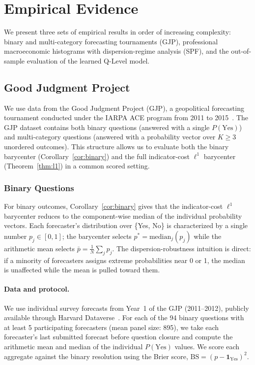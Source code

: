 \section{Empirical Evidence}
\label{sec:empirical}

We present three sets of empirical results in order of increasing complexity: binary and
multi-category forecasting tournaments (GJP), professional macroeconomic histograms with
dispersion-regime analysis (SPF), and the out-of-sample evaluation of the learned Q-Level
model.

\subsection{Good Judgment Project}
\label{sec:gjp}

We use data from the Good Judgment Project (GJP), a geopolitical forecasting tournament conducted under the IARPA ACE program from 2011 to 2015~\cite{tetlock16}.  The GJP dataset contains both binary questions (answered with a single $P(\text{Yes})$) and multi-category questions (answered with a probability vector over $K \geq 3$ unordered outcomes).  This structure allows us to evaluate both the binary barycenter (Corollary~\ref{cor:binary}) and the full indicator-cost $\ell^1$ barycenter (Theorem~\ref{thm:l1}) in a common scored setting.

\subsubsection{Binary Questions}
\label{sec:gjp_binary}

For binary outcomes, Corollary~\ref{cor:binary} gives that the indicator-cost $\ell^1$ barycenter reduces to the component-wise median of the individual probability vectors.  Each forecaster's distribution over \{Yes, No\} is characterized by a single number $p_j \in [0,1]$; the barycenter selects $p^* = \mathrm{median}_j(p_j)$ while the arithmetic mean selects $\bar{p} = \frac{1}{N}\sum_j p_j$.  The dispersion-robustness intuition is direct: if a minority of forecasters assigns extreme probabilities near 0 or 1, the median is unaffected while the mean is pulled toward them.

\paragraph{Data and protocol.}  We use individual survey forecasts from Year~1 of the GJP (2011--2012), publicly available through Harvard Dataverse~\cite{tetlock_dataverse}.  For each of the 94 binary questions with at least 5 participating forecasters (mean panel size: 895), we take each forecaster's last submitted forecast before question closure and compute the arithmetic mean and median of the individual $P(\text{Yes})$ values.  We score each aggregate against the binary resolution using the Brier score, $\mathrm{BS} = (p - \mathbf{1}_{\text{Yes}})^2$.


